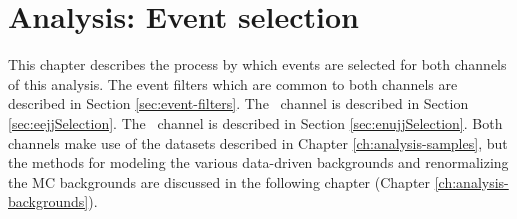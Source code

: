 \chapter{Analysis: Event selection}
\label{ch:analysis-event-selection}

This chapter describes the process
by which events are selected for both channels of this analysis.
The event filters which are common to both channels are
described in Section \ref{sec:event-filters}.
The \eejj~channel  is described in Section \ref{sec:eejjSelection}.
The \enujj~channel is described in Section \ref{sec:enujjSelection}.
Both channels make use of the datasets described in Chapter \ref{ch:analysis-samples}, but
the methods for modeling the various data-driven backgrounds
and renormalizing the MC backgrounds are discussed in the following
chapter (Chapter \ref{ch:analysis-backgrounds}).
